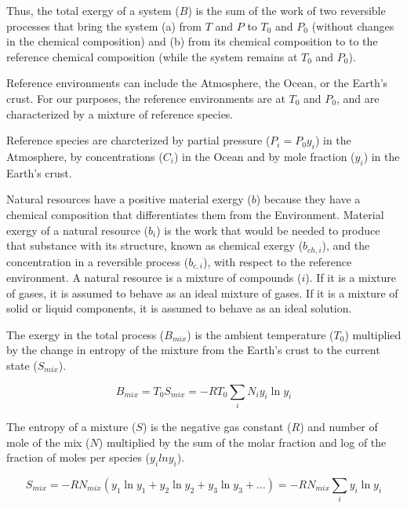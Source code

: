 \documentclass[energies,article,submit,pdftex,moreauthors]{Definitions/mdpi}
\begin{document}
Thus, the total exergy of a system ($B$)
is the sum of the work of two reversible processes
that bring the system
(a) from $T$ and $P$ to
$T_{0}$ and $P_{0}$
(without changes in the chemical composition) and
(b) from its chemical composition to
to the reference chemical composition
(while the system remains at $T_{0}$ and $P_{0}$).


Reference environments can include the Atmosphere,
the Ocean, or the Earth's crust.
For our purposes,
the reference environments are at $T_{0}$ and $P_{0}$,
and are characterized by a mixture of reference species.

Reference species are charcterized by partial pressure
($P_{i} = P_{0} y_{i}$) in the Atmosphere,
by concentrations ($C_{i}$) in the Ocean
and by mole fraction ($y_{i}$)
in the Earth's crust.


Natural resources have a positive material exergy ($b$)
because they have a chemical composition
that differentiates them from the Environment.
Material exergy of a natural resource ($b_{i}$)
is the work that would be needed
to produce that substance with its structure,
known as chemical exergy ($b_{ch,i}$),
and the concentration in a reversible process ($b_{c,i}$),
with respect to the reference environment.
A natural resource is a mixture of compounds ($i$).
If it is a mixture of gases,
it is assumed to behave as an ideal mixture of gases.
If it is a mixture of solid or liquid components,
it is assumed to behave as an ideal solution.

The exergy in the total process ($B_{mix}$) is the ambient temperature ($T_{0}$) multiplied by the change
in entropy of the mixture from the Earth's crust to the current state ($S_{mix}$).

\begin{equation}\label{eq:specific_exergy_of_mixture_definition1}
  B_{mix} = T_{0}S_{mix} = -RT_{0}\sum_{i}{N_{i}{y_{i}}\ln{y_{i}}}
\end{equation}

The entropy of a mixture ($S$) is the negative gas constant ($R$)
and number of mole of the mix ($N$)
multiplied by the sum of the molar fraction
and log of the fraction of moles per species ($y_i$$lny_i$).

\begin{equation}\label{eq:specific_entropy_of_mixture_definition}
  S_{mix} = -RN_{mix}(y_{1}\ln{y_{1}} + y_{2}\ln{y_{2}} + y_{3}\ln{y_{3}} + \ldots)
          = -RN_{mix}\sum_{i} y_{i}\ln{y_{i}}
\end{equation}
\end{document}
